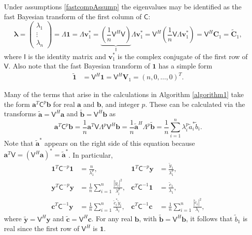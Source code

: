 \documentclass{svjour3}                     %
\newcommand{\bm}[1]{\boldsymbol{#1}}
\newcommand{\vlambda}{{\bm{\lambda}}}
\newcommand{\va}{\bm{a}}
\newcommand{\vb}{\bm{b}}
\newcommand{\vc}{\bm{c}}
\newcommand{\vC}{\bm{C}}
\newcommand{\vv}{\bm{v}}
\newcommand{\vV}{\bm{V}}
\newcommand{\vy}{\bm{y}}
\newcommand{\vone}{\bm{1}}
\newcommand{\mC}{\mathsf{C}}
\newcommand{\mCInv}{\mathsf{C}^{-1}}
\newcommand{\mLambda}{\mathsf{\Lambda}}
\newcommand{\mV}{\mathsf{V}}
\def\abs#1{\ensuremath{\left \lvert #1 \right \rvert}}
\begin{document}
Under assumptions \eqref{fastcompAssump} the eigenvalues may be identified as the fast Bayesian transform of the first column of $\mC$:
\begin{equation}
\vlambda 
= \begin{pmatrix}
\lambda_1 \\ \vdots \\ \lambda_n
\end{pmatrix} = \mLambda \vone = \mLambda \vv_1^* 
= \underbrace{\left( \frac 1n \mV^H  \mV \right) }_{\mathsf{I}} \mLambda \vv_1^* 
= \mV^H \left( \frac 1n \mV \mLambda \vv_1^* \right)
= \mV^H \vC_1 =  \widetilde{\vC}_1,
\label{eqn:fast_transform_to_eigvalues}
\end{equation}
where $\mathsf{I}$ is the identity matrix and $\vv_1^*$ is the complex conjugate of the first row of $\mV$.
Also note that the fast Bayesian transform of $\vone$ has a simple form
\begin{align*} 
\widetilde{\vone}
& = \mV^H \vone = \mV^H \vV_1 = 
\left(n, 0, \dots, 0 \right)^T.
\label{eqn:fast_transform_one}
\end{align*}

Many of the terms that arise in the calculations in  Algorithm \ref{algorithm1} take the form $\va^T\mC^{p}\vb$ for real $\va$ and $\vb$, and integer $p$.  These can be calculated via the transforms $\widetilde{\va} = \mV^H \va$ and $\widetilde{\vb} = \mV^H \vb$ as 
\begin{equation*}
\va^T\mC^p\vb = \frac 1n \va^T \mV \mLambda^p \mV^H \vb
= \frac 1n \widetilde{\va}^H\mLambda^p \widetilde{\vb}
= \frac 1n \sum_{i=1}^n \lambda_i^p \widetilde{a}_i^* \widetilde{b}_i.
\end{equation*}
Note that $\widetilde{\va}^*$ appears on the right side of this equation because $\va^T \mV = (\mV^H \va)^* = \widetilde{\va}^*$.  In particular,
\begin{align*}
\vone^T\mC^{-p}\vone & = \frac{n}{\lambda_1^p},
&
\vone^T\mC^{-p}\vy &= \frac{\widetilde{y}_1}{\lambda_1^p},
\\
\vy^T\mC^{-p} \vy &= \frac 1n \sum_{i=1}^n \frac{\abs{\widetilde{y}_i}^2}{\lambda_i^p},
&
\vc^T\mCInv \vone &= \frac{\widetilde{c}_1}{\lambda_1},\\
\vc^T\mCInv \vy &= \frac 1n \sum_{i=1}^n \frac{\widetilde{c}_i^* \widetilde{y}_i}{\lambda_i}, & 
\vc^T\mCInv \vc &= \frac 1n \sum_{i=1}^n \frac{\abs{\widetilde{c}_i}^2}{\lambda_i},
\end{align*}
where $\widetilde{\vy} = \mV^H \vy$ and 
$\widetilde{\vc} = \mV^H \vc$.  For any real $\vb$, with $\widetilde{\vb} = \mV^H\vb$, it follows that $\widetilde{b}_1$ is real since the first row of $\mV^H$ is $\vone$.
\end{document}
